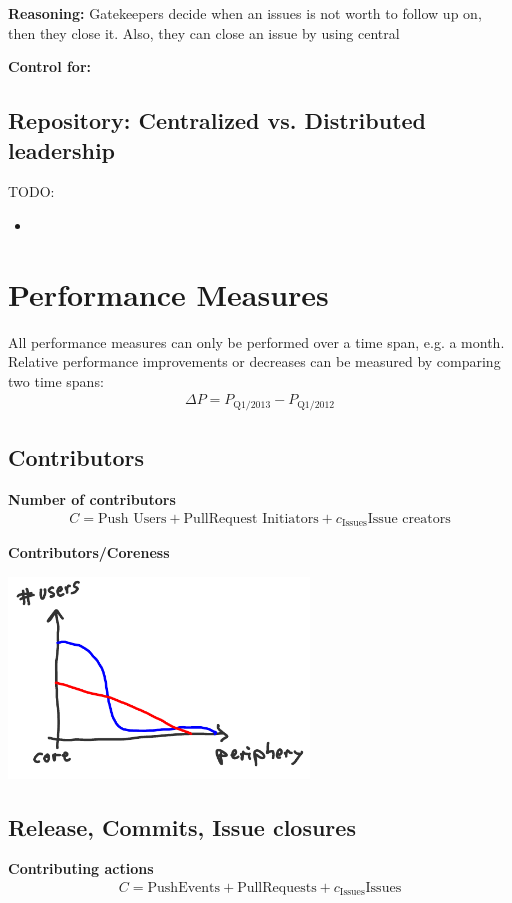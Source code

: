 \documentclass[a4paper,10pt]{article}
\begin{document}
\textbf{Reasoning:}
Gatekeepers decide when an issues is not worth to follow up on, then they close it. Also, they can close an issue by using central 

\textbf{Control for:}



\subsection{Repository: Centralized vs. Distributed leadership}
TODO:
\begin{itemize}
 \item 
\end{itemize}







\section{Performance Measures}
All performance measures can only be performed over a time span, e.g. a month. Relative performance improvements or decreases can be measured by comparing two time spans:
\begin{align}
 \Delta P = P_{\text{Q1/2013}}-P_{\text{Q1/2012}}
\end{align}


\subsection{Contributors}
\textbf{Number of contributors}
\begin{align}
 C = \text{Push Users} + \text{PullRequest Initiators} + c_{\text{Issues}} \text{Issue creators}
\end{align}

\textbf{Contributors/Coreness}

\centerline{
\includegraphics[width=8cm]{users-periphery.png}
}
\subsection{Release, Commits, Issue closures}
\textbf{Contributing actions}
\begin{align}
 C = \text{PushEvents} + \text{PullRequests} + c_{\text{Issues}} \text{Issues}
\end{align}
\end{document}
